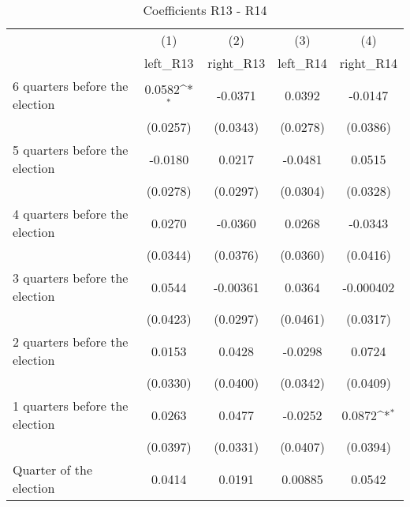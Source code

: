 \begin{table}[htbp]\centering
\def\sym#1{\ifmmode^{#1}\else\(^{#1}\)\fi}
\caption{Coefficients R13 - R14}
\begin{tabular}{l*{4}{c}}
\hline\hline
                    &\multicolumn{1}{c}{(1)}&\multicolumn{1}{c}{(2)}&\multicolumn{1}{c}{(3)}&\multicolumn{1}{c}{(4)}\\
                    &\multicolumn{1}{c}{left\_R13}&\multicolumn{1}{c}{right\_R13}&\multicolumn{1}{c}{left\_R14}&\multicolumn{1}{c}{right\_R14}\\
\hline
 6 quarters before the election&      0.0582\sym{*}  &     -0.0371         &      0.0392         &     -0.0147         \\
                    &    (0.0257)         &    (0.0343)         &    (0.0278)         &    (0.0386)         \\
[1em]
 5 quarters before the election&     -0.0180         &      0.0217         &     -0.0481         &      0.0515         \\
                    &    (0.0278)         &    (0.0297)         &    (0.0304)         &    (0.0328)         \\
[1em]
 4 quarters before the election&      0.0270         &     -0.0360         &      0.0268         &     -0.0343         \\
                    &    (0.0344)         &    (0.0376)         &    (0.0360)         &    (0.0416)         \\
[1em]
 3 quarters before the election&      0.0544         &    -0.00361         &      0.0364         &   -0.000402         \\
                    &    (0.0423)         &    (0.0297)         &    (0.0461)         &    (0.0317)         \\
[1em]
 2 quarters before the election&      0.0153         &      0.0428         &     -0.0298         &      0.0724         \\
                    &    (0.0330)         &    (0.0400)         &    (0.0342)         &    (0.0409)         \\
[1em]
 1 quarters before the election&      0.0263         &      0.0477         &     -0.0252         &      0.0872\sym{*}  \\
                    &    (0.0397)         &    (0.0331)         &    (0.0407)         &    (0.0394)         \\
[1em]
Quarter of the election&      0.0414         &      0.0191         &     0.00885         &      0.0542         \\

\end{tabular}
\end{table}
